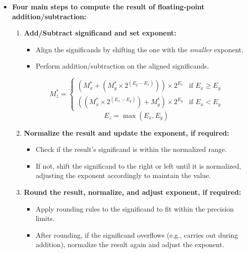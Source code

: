 \documentclass[12pt,openany]{book}
\begin{document}
			      	
			      	\newpage
			      	\begin{itemize}
			      		\item[] \textbf{Four main steps to compute the result of floating-point addition/subtraction:}
			      		      \begin{enumerate}
			      		      	\item \textbf{Add/Subtract significand and set exponent:}
			      		      	      \begin{itemize}
			      		      	      	\item Align the significands by shifting the one with the \textit{smaller} exponent.
			      		      	      	\item Perform addition/subtraction on the aligned significands.
			      		      	      \end{itemize}
			      		      	      \[
			      		      	      	M_z^* = 
			      		      	      	\begin{cases} 
			      		      	      		(M_x^* + (M_y^* \times 2^{(E_y - E_x)})) \times 2^{E_x} & \text{if } E_x \geq E_y \\
			      		      	      		((M_x^* \times 2^{(E_x - E_y)}) + M_y^*) \times 2^{E_y} & \text{if } E_x < E_y    
			      		      	      	\end{cases}
			      		      	      \]
			      		      	      \[
			      		      	      	E_z = \max(E_x, E_y)
			      		      	      \]
			      		      	            
			      		      	\item \textbf{Normalize the result and update the exponent, if required:}
			      		      	      \begin{itemize}
			      		      	      	\item Check if the result's significand is within the normalized range.
			      		      	      	\item If not, shift the significand to the right or left until it is normalized, adjusting the exponent accordingly to maintain the value.
			      		      	      \end{itemize}
			      		      	          
			      		      	\item \textbf{Round the result, normalize, and adjust exponent, if required:}
			      		      	      \begin{itemize}
			      		      	      	\item Apply rounding rules to the significand to fit within the precision limits.
			      		      	      	\item After rounding, if the significand overflows (e.g., carries out during addition), normalize the result again and adjust the exponent.
			      		      	      \end{itemize}
			      		      	          

\end{enumerate}
\end{itemize}
\end{document}
